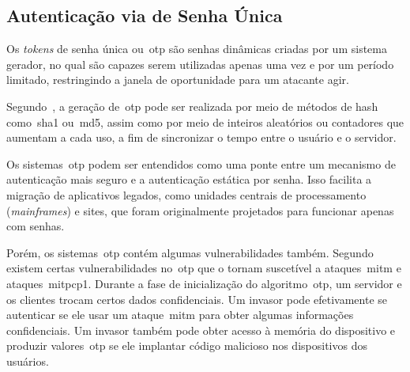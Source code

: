 \subsection{Autenticação via  de Senha Única}
\label{subsec:autenticacao-token-senha-unica}

Os \textit{tokens} de senha única ou~\acrfull{otp} são senhas dinâmicas criadas
por um sistema gerador, no qual são capazes serem utilizadas apenas uma vez e
por um período limitado, restringindo a janela de oportunidade para
um atacante agir\cite{christiana2019}.

Segundo~\textcite{huiyi2013}, a geração de~\acrshort{otp} pode ser realizada
por meio de métodos de hash como~\acrfull{sha1} ou~\acrfull{md5}, assim como por
meio de inteiros aleatórios ou contadores que aumentam a cada uso, a fim de
sincronizar o tempo entre o usuário e o servidor.

Os sistemas~\acrshort{otp} podem ser entendidos como uma ponte entre um
mecanismo de autenticação mais seguro e a autenticação estática por senha.
Isso facilita a migração de aplicativos legados, como unidades centrais de
processamento (\textit{mainframes}) e sites, que foram originalmente projetados
para funcionar apenas com senhas\cite{idrus2013}.

Porém, os sistemas~\acrshort{otp} contém algumas vulnerabilidades também.
Segundo~\textcite{hoyul2015} existem certas vulnerabilidades no~\acrshort{otp
} que o tornam
suscetível a ataques~\acrfull{mitm} e ataques~\acrfull{mitpcp1}.
Durante a fase de inicialização do algoritmo~\acrshort{otp}, um servidor e os
clientes trocam certos dados confidenciais.
Um invasor pode efetivamente se autenticar se ele usar um ataque~\acrshort{mitm}
para obter algumas informações confidenciais.
Um invasor também pode obter acesso à memória do dispositivo e
produzir valores~\acrshort{otp} se ele implantar código malicioso nos
dispositivos dos usuários\cite{hoyul2015}.